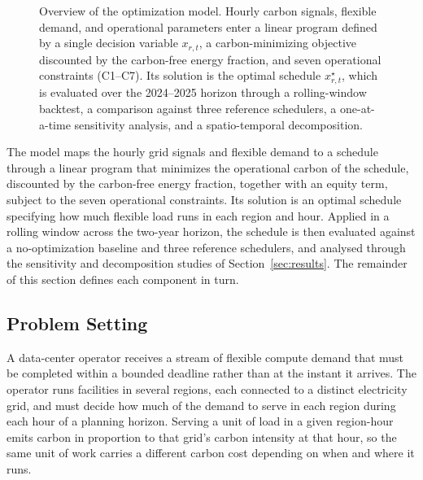 \begin{figure}[t]
\caption{Overview of the optimization model. Hourly carbon signals, flexible demand, and operational parameters enter a linear program defined by a single decision variable $x_{r,t}$, a carbon-minimizing objective discounted by the carbon-free energy fraction, and seven operational constraints (C1--C7). Its solution is the optimal schedule $x^{\star}_{r,t}$, which is evaluated over the 2024--2025 horizon through a rolling-window backtest, a comparison against three reference schedulers, a one-at-a-time sensitivity analysis, and a spatio-temporal decomposition.}
\label{fig:model-overview}
\end{figure}

The model maps the hourly grid signals and flexible demand to a schedule through a linear program that minimizes the operational carbon of the schedule, discounted by the carbon-free energy fraction, together with an equity term, subject to the seven operational constraints. Its solution is an optimal schedule specifying how much flexible load runs in each region and hour. Applied in a rolling window across the two-year horizon, the schedule is then evaluated against a no-optimization baseline and three reference schedulers, and analysed through the sensitivity and decomposition studies of Section~\ref{sec:results}. The remainder of this section defines each component in turn.

\subsection{Problem Setting}
\label{sec:form-setting}

A data-center operator receives a stream of flexible compute demand that must be completed within a bounded deadline rather than at the instant it arrives. The operator runs facilities in several regions, each connected to a distinct electricity grid, and must decide how much of the demand to serve in each region during each hour of a planning horizon. Serving a unit of load in a given region-hour emits carbon in proportion to that grid's carbon intensity at that hour, so the same unit of work carries a different carbon cost depending on when and where it runs.

